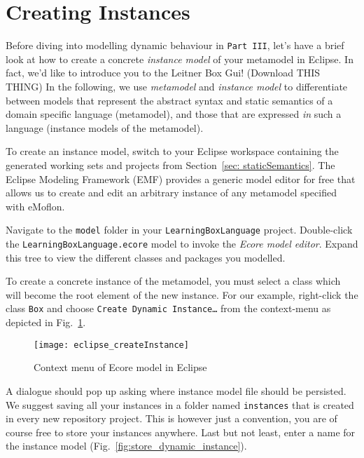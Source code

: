 \newpage
\genHeader

\section{Creating Instances}

\hypertarget{creatingInstance common}{}Before diving into modelling dynamic behaviour in \texttt{Part III}, let's have a brief look at how to create a concrete \emph{instance model} of your metamodel in Eclipse. In fact, we'd like to introduce you to the Leitner Box Gui! (Download THIS THING)
In the following, we use \emph{metamodel} and \emph{instance model} to differentiate between models that represent the abstract syntax and static semantics of a domain specific language (metamodel), and those that are expressed \emph{in} such a language (instance models of the metamodel).

To create an instance model, switch to your Eclipse workspace containing the generated working sets and projects from Section~\ref{sec: staticSemantics}. The Eclipse Modeling Framework (EMF) provides a generic model editor for free that allows us to create and edit an arbitrary instance of any metamodel specified with eMoflon.

Navigate to the \texttt{model} folder in your \texttt{LearningBoxLanguage} project.
Double-click the \texttt{LearningBoxLanguage.ecore} model to invoke  the \emph{Ecore model editor}.
Expand this tree to view the different classes and packages you modelled. %

To create a concrete instance of the metamodel, you must select a class which will become the root element of the new instance.
For our example, right-click the class \texttt{Box} and choose \texttt{Create Dynamic Instance\ldots} from the context-menu as depicted in Fig.~\ref{fig:context_menu}.

\begin{figure}[htbp]
	\centering
  \texttt{[image: eclipse\_createInstance]}
	\caption{Context menu of Ecore model in Eclipse}
	\label{fig:context_menu}
\end{figure}


A dialogue should pop up asking where instance model file should be persisted.
We suggest saving all your instances in a folder named \texttt{instances} that is created in every new repository project.
This is however just a convention, you are of course free to store your instances anywhere.
Last but not least, enter a name for the instance model (Fig.~\ref{fig:store_dynamic_instance}).

